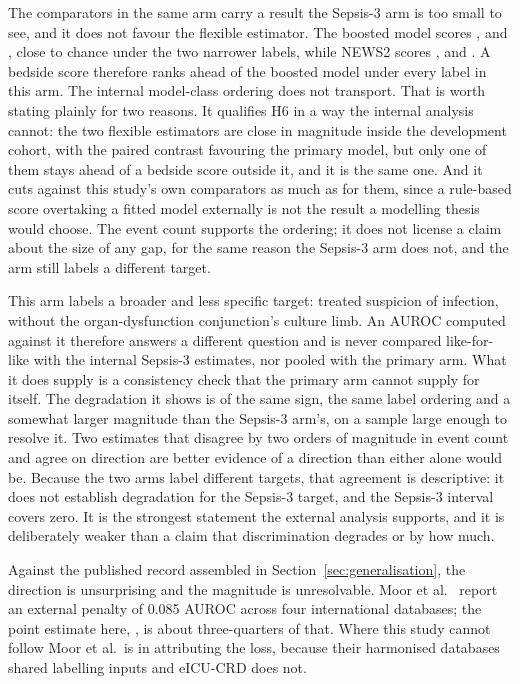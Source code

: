The comparators in the same arm carry a result the Sepsis-3 arm is too small to
see, and it does not favour the flexible estimator. The boosted model scores
\pcExtAbxAurocGbtA, \pcExtAbxAurocGbtB{} and \pcExtAbxAurocGbtC, close to
chance under the two narrower labels, while NEWS2 scores
\pcExtAbxAurocNewsA, \pcExtAbxAurocNewsB{} and \pcExtAbxAurocNewsC. A bedside
score therefore ranks ahead of the boosted model under every label in this arm.
The internal model-class ordering does not transport. That is worth stating
plainly for two reasons. It qualifies H6 in a way the internal analysis cannot:
the two flexible estimators are close in magnitude inside the development
cohort, with the paired contrast favouring the primary model, but only one of
them stays ahead of a bedside score outside it, and it is the same one. And it cuts against this study's own
comparators as much as for them, since a rule-based score overtaking a fitted
model externally is not the result a modelling thesis would choose. The event
count supports the ordering; it does not license a claim about the size of any
gap, for the same reason the Sepsis-3 arm does not, and the arm still labels a
different target.

This arm labels a broader and less specific target: treated suspicion of
infection, without the organ-dysfunction conjunction's culture limb. An AUROC
computed against it therefore answers a different question and is never
compared like-for-like with the internal Sepsis-3 estimates, nor pooled with the
primary arm. What it does supply is a consistency check that the primary arm
cannot supply for itself. The degradation it shows is of the same sign, the same
label ordering and a somewhat larger magnitude than the Sepsis-3 arm's, on a
sample large enough to resolve it. Two estimates that disagree by two orders of
magnitude in event count and agree on direction are better evidence of a
direction than either alone would be. Because the two arms label different
targets, that agreement is descriptive: it does not establish degradation for
the Sepsis-3 target, and the Sepsis-3 interval covers zero. It is the strongest
statement the external analysis supports, and it is deliberately weaker than a
claim that discrimination degrades or by how much.

Against the published record assembled in Section~\ref{sec:generalisation},
the direction is unsurprising and the magnitude is unresolvable. Moor et al.\
\cite{moor2023review} report an external penalty of 0.085 AUROC across four
international databases; the point estimate here, \pcHFiveEst, is about
three-quarters of that. Where this study cannot follow Moor et al.\ is in
attributing the loss, because their harmonised databases shared labelling
inputs and eICU-CRD does not.


